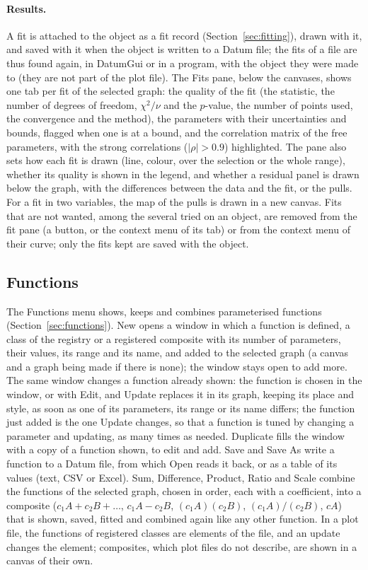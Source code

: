 \paragraph{Results.}
A fit is attached to the object as a fit record (Section~\ref{sec:fitting}), drawn with it, and saved with it when
the object is written to a Datum file; the fits of a file are thus found again, in DatumGui or in a program, with the
object they were made to (they are not part of the plot file). The Fits pane, below the canvases, shows one tab per fit of the selected graph: the
quality of the fit (the statistic, the number of degrees of freedom, $\chi^2/\nu$ and the $p$-value, the number of
points used, the convergence and the method), the parameters with their uncertainties and bounds, flagged when one
is at a bound, and the correlation matrix of the free parameters, with the strong correlations ($|\rho|>0.9$)
highlighted. The pane also sets how each fit is drawn (line, colour, over the selection or the whole range), whether
its quality is shown in the legend, and whether a residual panel is drawn below the graph, with the differences
between the data and the fit, or the pulls. For a fit in two variables, the map of the pulls is drawn in a new
canvas. Fits that are not wanted, among the several tried on an object, are removed from the fit pane (a button, or
the context menu of its tab) or from the context menu of their curve; only the fits kept are saved with the object.

\subsection{Functions}
\label{sec:guifunctions}

The Functions menu shows, keeps and combines parameterised functions (Section~\ref{sec:functions}). New opens a window
in which a function is defined, a class of the registry or a registered composite with its number of parameters,
their values, its range and its name, and added to the selected graph (a canvas and a graph being made if there is
none); the window stays open to add more. The same window changes a function already shown: the function is chosen in
the window, or with Edit, and Update replaces it in its graph, keeping its place and style, as soon as one of its
parameters, its range or its name differs; the function just added is the one Update changes, so that a function is
tuned by changing a parameter and updating, as many times as needed. Duplicate fills the window with a copy of a
function shown, to edit and add. Save and Save As write a function to a Datum file, from which Open reads it back, or
as a table of its values (text, CSV or Excel). Sum, Difference, Product, Ratio and Scale combine the functions of the
selected graph, chosen in order, each with a coefficient, into a composite ($c_1 A + c_2 B + \ldots$, $c_1 A - c_2 B$,
$(c_1 A)(c_2 B)$, $(c_1 A)/(c_2 B)$, $c A$) that is shown, saved, fitted and combined again like any other function.
In a plot file, the functions of registered classes are elements of the file, and an update changes the element;
composites, which plot files do not describe, are shown in a canvas of their own.

